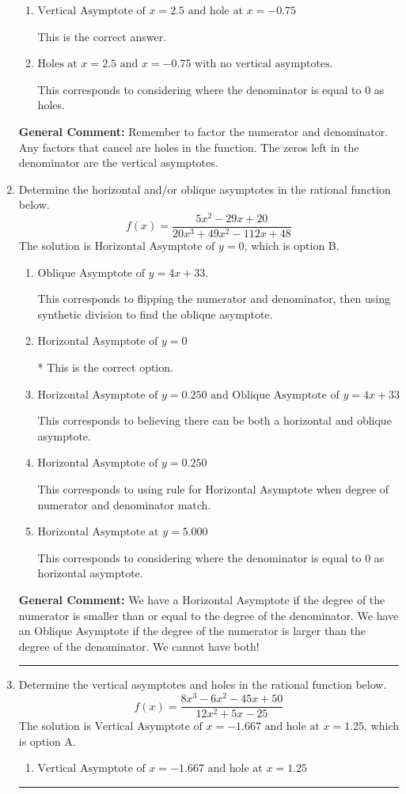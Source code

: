 \documentclass{extbook}[14pt]
\newcommand{\litem}[1]{\item #1

\rule{\textwidth}{0.4pt}}
\begin{document}
\begin{enumerate}
{\begin{enumerate}[label=\Alph*.]
This corresponds to mixing vertical and horizontal asymptotes.
\item \( \text{Vertical Asymptote of } x = 2.5 \text{ and hole at } x = -0.75 \)

This is the correct answer.
\item \( \text{Holes at } x = 2.5 \text{ and } x = -0.75 \text{ with no vertical asymptotes.} \)

This corresponds to considering where the denominator is equal to 0 as holes.
\end{enumerate}

\textbf{General Comment:} Remember to factor the numerator and denominator. Any factors that cancel are holes in the function. The zeros left in the denominator are the vertical asymptotes.
}
\litem{
Determine the horizontal and/or oblique asymptotes in the rational function below.
\[ f(x) = \frac{5x^{2} -29 x + 20}{20x^{3} +49 x^{2} -112 x + 48} \]The solution is \( \text{Horizontal Asymptote of } y = 0 \), which is option B.\begin{enumerate}[label=\Alph*.]
\item \( \text{Oblique Asymptote of } y = 4x + 33. \)

This corresponds to flipping the numerator and denominator, then using synthetic division to find the oblique asymptote.
\item \( \text{Horizontal Asymptote of } y = 0 \)

* This is the correct option.
\item \( \text{Horizontal Asymptote of } y = 0.250 \text{ and Oblique Asymptote of } y = 4x + 33 \)

This corresponds to believing there can be both a horizontal and oblique asymptote.
\item \( \text{Horizontal Asymptote of } y = 0.250  \)

This corresponds to using rule for Horizontal Asymptote when degree of numerator and denominator match.
\item \( \text{Horizontal Asymptote at } y = 5.000 \)

This corresponds to considering where the denominator is equal to 0 as horizontal asymptote.
\end{enumerate}

\textbf{General Comment:} We have a Horizontal Asymptote if the degree of the numerator is smaller than or equal to the degree of the denominator. We have an Oblique Asymptote if the degree of the numerator is larger than the degree of the denominator. We cannot have both!
}
\litem{
Determine the vertical asymptotes and holes in the rational function below.
\[ f(x) = \frac{8x^{3} -6 x^{2} -45 x + 50}{12x^{2} +5 x -25} \]The solution is \( \text{Vertical Asymptote of } x = -1.667 \text{ and hole at } x = 1.25 \), which is option A.\begin{enumerate}[label=\Alph*.]
\item \( \text{Vertical Asymptote of } x = -1.667 \text{ and hole at } x = 1.25 \)


\end{enumerate}}
\end{enumerate}
\end{document}
